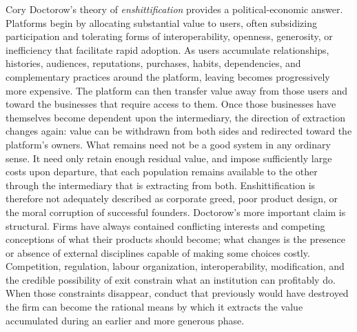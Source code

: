 \documentclass[11pt]{article}
\begin{document}
Cory Doctorow's theory of \emph{enshittification} \citep{doctorow2023enshittification,doctorow2024enshittification,doctorowgiblin2022chokepoint} provides a political-economic answer. Platforms begin by allocating substantial value to users, often subsidizing participation and tolerating forms of interoperability, openness, generosity, or inefficiency that facilitate rapid adoption. As users accumulate relationships, histories, audiences, reputations, purchases, habits, dependencies, and complementary practices around the platform, leaving becomes progressively more expensive. The platform can then transfer value away from those users and toward the businesses that require access to them. Once those businesses have themselves become dependent upon the intermediary, the direction of extraction changes again: value can be withdrawn from both sides and redirected toward the platform's owners. What remains need not be a good system in any ordinary sense. It need only retain enough residual value, and impose sufficiently large costs upon departure, that each population remains available to the other through the intermediary that is extracting from both. Enshittification is therefore not adequately described as corporate greed, poor product design, or the moral corruption of successful founders. Doctorow's more important claim is structural. Firms have always contained conflicting interests and competing conceptions of what their products should become; what changes is the presence or absence of external disciplines capable of making some choices costly. Competition, regulation, labour organization, interoperability, modification, and the credible possibility of exit constrain what an institution can profitably do. When those constraints disappear, conduct that previously would have destroyed the firm can become the rational means by which it extracts the value accumulated during an earlier and more generous phase.
\end{document}
